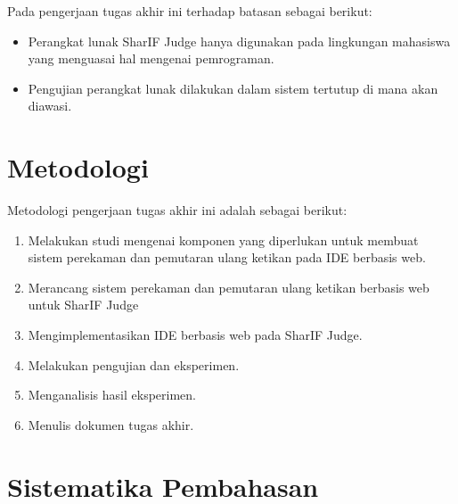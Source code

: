 Pada pengerjaan tugas akhir ini terhadap batasan sebagai berikut:
\begin{itemize}
    \item Perangkat lunak SharIF Judge hanya digunakan pada lingkungan mahasiswa yang menguasai hal mengenai pemrograman.
    \item Pengujian perangkat lunak dilakukan dalam sistem tertutup di mana akan  diawasi.
\end{itemize}

\section{Metodologi}
\label{sec:1:metlit}

Metodologi pengerjaan tugas akhir ini adalah sebagai berikut:
\begin{enumerate}
    \item Melakukan studi mengenai komponen yang diperlukan untuk membuat sistem perekaman dan pemutaran ulang ketikan pada IDE berbasis web.
    \item Merancang sistem perekaman dan pemutaran ulang ketikan berbasis web untuk SharIF Judge
    \item Mengimplementasikan IDE berbasis web pada SharIF Judge.
    \item Melakukan pengujian dan eksperimen.
    \item Menganalisis hasil eksperimen.
    \item Menulis dokumen tugas akhir.
\end{enumerate}

\section{Sistematika Pembahasan}
\label{sec:1:sispem}

